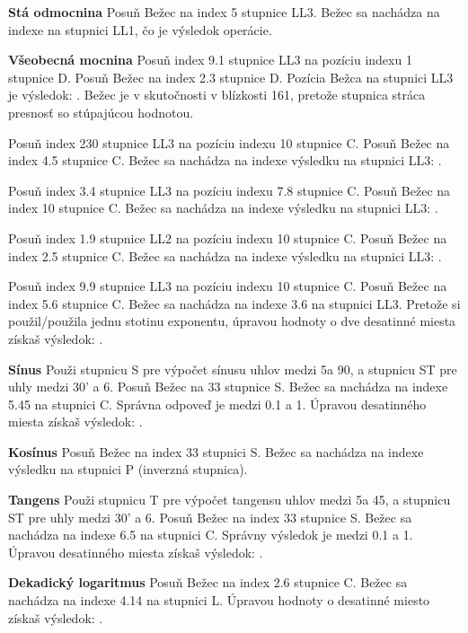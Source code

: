 \begin{multicols*}{3}
{  \textbf{Stá odmocnina}
Posuň Bežec na index 5 stupnice LL3.
Bežec sa nachádza na indexe  na stupnici LL1, čo je výsledok operácie.

  \textbf{Všeobecná mocnina}
Posuň index 9.1 stupnice LL3 na pozíciu indexu 1 stupnice D.
Posuň Bežec na index 2.3 stupnice D.
Pozícia Bežca na stupnici LL3 je výsledok: . Bežec je v skutočnosti v blízkosti 161, pretože stupnica stráca presnosť so stúpajúcou hodnotou. 

Posuň index 230 stupnice LL3 na pozíciu indexu 10 stupnice C.
Posuň Bežec na index 4.5 stupnice C.
Bežec sa nachádza na indexe výsledku na stupnici LL3: .

Posuň index 3.4 stupnice LL3 na pozíciu indexu 7.8 stupnice C.
Posuň Bežec na index 10 stupnice C.
Bežec sa nachádza na indexe výsledku na stupnici LL3: .

Posuň index 1.9 stupnice LL2 na pozíciu indexu 10 stupnice C.
Posuň Bežec na index 2.5 stupnice C.
Bežec sa nachádza na indexe výsledku na stupnici LL3: .

Posuň index 9.9 stupnice LL3 na pozíciu indexu 10 stupnice C.
Posuň Bežec na index 5.6 stupnice C.
Bežec sa nachádza na indexe 3.6 na stupnici LL3.
Pretože si použil/použila jednu stotinu exponentu, úpravou hodnoty o dve desatinné miesta získaš výsledok: .

  \textbf{Sínus}
\footnotesize Použi stupnicu S pre výpočet sínusu uhlov medzi 5\textdegree a 90\textdegree, a stupnicu ST pre uhly medzi 30' a 6\textdegree. \normalsize
{}
Posuň Bežec na 33 stupnice S.
Bežec sa nachádza na indexe 5.45 na stupnici C.
Správna odpoveď je medzi 0.1 a 1. Úpravou desatinného miesta získaš výsledok: .

  \textbf{Kosínus}
Posuň Bežec na index 33 stupnici S.
Bežec sa nachádza na indexe výsledku  na stupnici P (inverzná stupnica).

  \textbf{Tangens}
\footnotesize Použi stupnicu T pre výpočet tangensu uhlov medzi 5\textdegree a 45\textdegree, a stupnicu ST pre uhly medzi 30' a 6\textdegree. \normalsize
{}
Posuň Bežec na index 33 stupnice S.
Bežec sa nachádza na indexe 6.5 na stupnici C.
Správny výsledok je medzi 0.1 a 1. Úpravou desatinného miesta získaš výsledok: .

  \textbf{Dekadický logaritmus}
Posuň Bežec na index 2.6 stupnice C.
Bežec sa nachádza na indexe 4.14 na stupnici L.
Úpravou hodnoty o desatinné miesto získaš výsledok: .
  }
  \end{multicols*}
  

